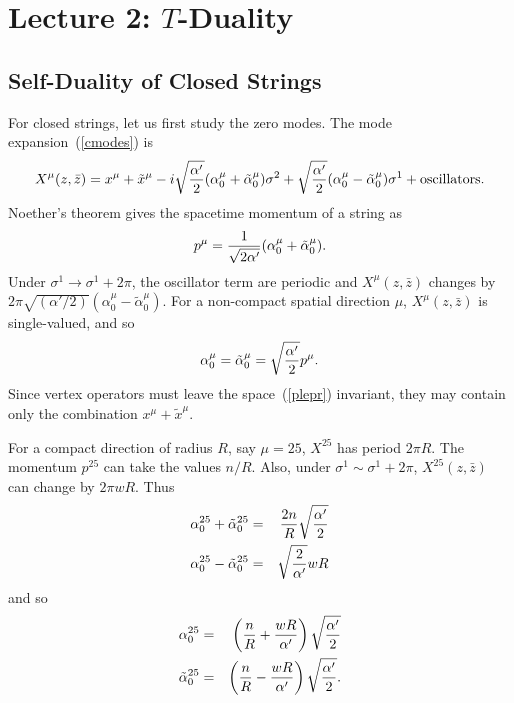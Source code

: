 \documentclass[12pt]{article}
\def\be{\begin{equation}}
\def\ee{\end{equation}}
\def\bea{\begin{eqnarray}}
\def\eea{\end{eqnarray}}
\def\ap{\alpha'}
\newcommand{\zb}{{\bar{z}}}
\begin{document}
\section{Lecture 2: $T$-Duality}

\subsection{Self-Duality of Closed Strings}

For closed strings, let us first study the zero modes.  The mode
expansion~(\ref{cmodes}) is
\be
X^\mu(z,\zb) = x^\mu + \tilde x^\mu -i\sqrt{\ap\over2}
(\alpha^\mu_0+{\tilde\alpha}^\mu_0)\sigma^2 + \sqrt{\ap\over2}
(\alpha^\mu_0-{\tilde\alpha}^\mu_0)\sigma^1
+ {\rm oscillators}.
\ee
Noether's theorem gives the spacetime momentum of a string as
\be
p^\mu =
{1\over{\sqrt{2\ap}}}(\alpha^\mu_0 + {\tilde\alpha}^\mu_0).
\ee
Under $\sigma^1 \to \sigma^1+2\pi$,
the oscillator term are periodic and $X^\mu(z,\zb)$
changes by $2\pi\sqrt{(\ap/2)}(\alpha^\mu_0-{\tilde\alpha}^\mu_0).$
For a non-compact spatial direction $\mu$, $X^\mu(z,\zb)$ is single-valued,
and so 
\be
\alpha^\mu_0={\tilde\alpha}^\mu_0=\sqrt{\ap\over2}p^\mu. \label{plepr}
\ee
Since vertex operators must leave the space~(\ref{plepr}) invariant,
they may contain only the combination $x^\mu + \tilde x^\mu$.

For a compact direction of radius $R$, say $\mu=25$, $X^{25}$ has period
$2\pi R$. The momentum $p^{25}$ can take the values $n/R$.
Also, under $\sigma^1\sim\sigma^1+2\pi$, $X^{25}(z,\zb)$
can change by $2\pi wR$.  Thus
\bea
\alpha^{25}_0+{\tilde\alpha}^{25}_0 &=&
{2n\over R}\sqrt{\ap\over2} \nonumber\\
\alpha^{25}_0-{\tilde\alpha}^{25}_0 &=& 
\sqrt{2 \over \ap}wR
\eea
and so
\bea
\alpha^{25}_0 &=& \left({n\over R}+{wR\over\ap}\right)
\sqrt{\ap\over2} \nonumber\\
{\tilde\alpha}^{25}_0 &=&
\left({n\over R}-{wR\over\ap}\right)\sqrt{\ap\over2}.
\eea
\end{document}
